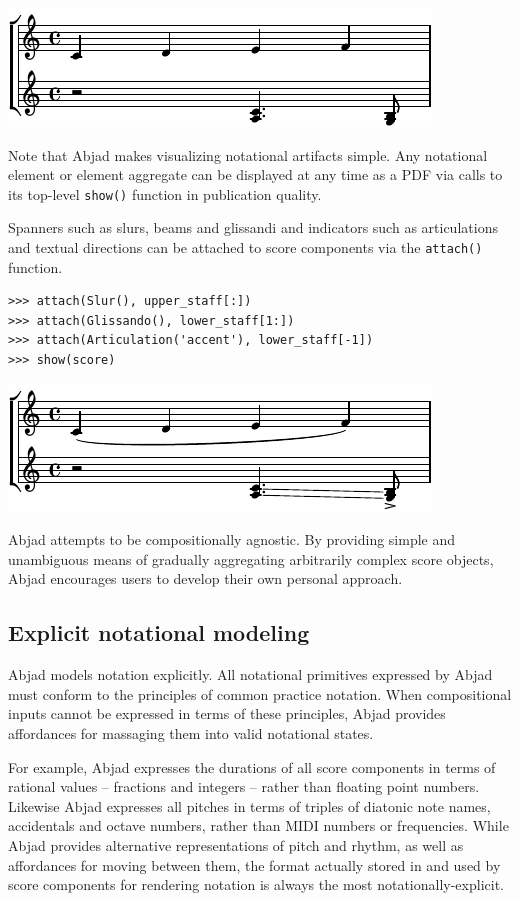 \includegraphics[scale=1.0]{images/section_2_notational_isomorphism-1.pdf}


Note that Abjad makes visualizing notational artifacts simple. Any notational
element or element aggregate can be displayed at any time as a PDF via calls to
its top-level \texttt{show()} function in publication quality.

Spanners such as slurs, beams and glissandi and indicators such as
articulations and textual directions can be attached to score components via
the \texttt{attach()} function.

\begin{lstlisting}
>>> attach(Slur(), upper_staff[:])
>>> attach(Glissando(), lower_staff[1:])
>>> attach(Articulation('accent'), lower_staff[-1])
>>> show(score)
\end{lstlisting}

\includegraphics[scale=1.0]{images/section_2_notational_isomorphism-2.pdf}


Abjad attempts to be compositionally agnostic. By providing simple and
unambiguous means of gradually aggregating arbitrarily complex score objects,
Abjad encourages users to develop their own personal approach.

\subsection{Explicit notational modeling}

Abjad models notation explicitly. All notational primitives expressed by Abjad
must conform to the principles of common practice notation. When compositional
inputs cannot be expressed in terms of these principles, Abjad provides
affordances for massaging them into valid notational states.

For example, Abjad expresses the durations of all score components in terms of
rational values -- fractions and integers -- rather than floating point
numbers. Likewise Abjad expresses all pitches in terms of triples of diatonic
note names, accidentals and octave numbers, rather than MIDI numbers or
frequencies. While Abjad provides alternative representations of pitch and
rhythm, as well as affordances for moving between them, the format actually
stored in and used by score components for rendering notation is always the
most notationally-explicit.

